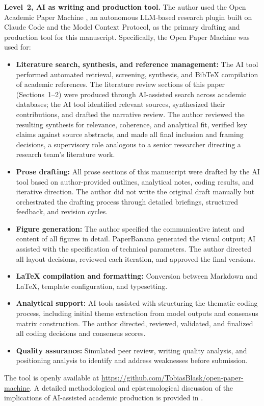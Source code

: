 \documentclass[preprint,review,12pt]{elsarticle}
\begin{document}
\textbf{Level~2, AI as writing and production tool.} The author used the Open Academic Paper Machine \citep{blask2026openpapermachine}, an autonomous LLM-based research plugin built on Claude Code and the Model Context Protocol, as the primary drafting and production tool for this manuscript. Specifically, the Open Paper Machine was used for:
\begin{itemize}
 \item \textbf{Literature search, synthesis, and reference management:} The AI tool performed automated retrieval, screening, synthesis, and BibTeX compilation of academic references. The literature review sections of this paper (Sections~1--2) were produced through AI-assisted search across academic databases; the AI tool identified relevant sources, synthesized their contributions, and drafted the narrative review. The author reviewed the resulting synthesis for relevance, coherence, and analytical fit, verified key claims against source abstracts, and made all final inclusion and framing decisions, a supervisory role analogous to a senior researcher directing a research team's literature work.
 \item \textbf{Prose drafting:} All prose sections of this manuscript were drafted by the AI tool based on author-provided outlines, analytical notes, coding results, and iterative direction. The author did not write the original draft manually but orchestrated the drafting process through detailed briefings, structured feedback, and revision cycles.
 \item \textbf{Figure generation:} The author specified the communicative intent and content of all figures in detail. PaperBanana \citep{zhu2026paperbanana} generated the visual output; AI assisted with the specification of technical parameters. The author directed all layout decisions, reviewed each iteration, and approved the final versions.
 \item \textbf{\LaTeX{} compilation and formatting:} Conversion between Markdown and \LaTeX{}, template configuration, and typesetting.
 \item \textbf{Analytical support:} AI tools assisted with structuring the thematic coding process, including initial theme extraction from model outputs and consensus matrix construction. The author directed, reviewed, validated, and finalized all coding decisions and consensus scores.
 \item \textbf{Quality assurance:} Simulated peer review, writing quality analysis, and positioning analysis to identify and address weaknesses before submission.
\end{itemize}
The tool is openly available at \url{https://github.com/TobiasBlask/open-paper-machine}. A detailed methodological and epistemological discussion of the implications of AI-assisted academic production is provided in \citet{blask2026orchestrator}.
\end{document}

